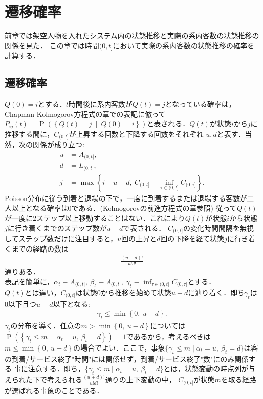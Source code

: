 \documentclass[a4j,papersize,disablejfam,slide,14pt]{jsarticle}
\def\max#1#2{\operatorname{max} \left\{ #1,\ #2 \right\}} %
\def\min#1#2{\operatorname{min} \left\{ #1,\ #2 \right\}} %
\def\inf#1#2{\operatorname*{inf}_{#1} #2 } %
\def\cprob#1#2{\operatorname{P} \left(\left\{ #1 \ \middle|\ #2 \right\}\right)} %
\begin{document}
\section{遷移確率}
	前章では架空人物を入れたシステム内の状態推移と実際の系内客数の状態推移の関係を見た．
	この章では時間$(0,t]$において実際の系内客数の状態推移の確率を計算する．

\subsection{遷移確率}
\label{sec:transient_prob}
    $Q(0)=i$とする．$t$時間後に系内客数が$Q(t)=j$となっている確率は，{\rm Chapman-Kolmogorov}方程式の章での表記に倣って
    $P_{ij}(t) = \cprob{Q(t)=j}{Q(0)=i}$と表される．$Q(t)$が状態$i$から$j$に推移する間に，$C_{(0, t]}$が上昇する回数と下降する回数をそれぞれ
    $u,d$と表す．当然，次の関係が成り立つ:
    \begin{align}
    	u &= A_{(0, t]}, \\
        d &= L_{(0, t]}, \\
    	j &= \max{i + u - d}{C_{(0, t]} - \inf{\tau \in (0, t]}{C_{(0, \tau]}}}. 
    \end{align}
    {\rm Poisson}分布に従う到着と退場の下で，一度に到着するまたは退場する客数が二人以上となる確率は$0$である．({\rm Kolmogorov}の前進方程式の章参照)
    従って$Q(t)$が一度に$2$ステップ以上移動することはない．これにより$Q(t)$が状態$i$から状態$j$に行き着くまでのステップ数が$u+d$で表される．
    $C_{(0, t]}$の変化時間間隔を無視してステップ数だけに注目すると，$u$回の上昇と$d$回の下降を経て状態$j$に行き着くまでの経路の数は
    \begin{align}
    	\frac{(u+d)!}{u!d!}
    \end{align}
    通りある．\\
    表記を簡単に，$\alpha_t \equiv A_{(0, t]},\ \beta_t \equiv A_{(0, t]},\ \gamma_t \equiv \inf{\tau \in (0, t]}{C_{(0, \tau]}}$とする．\\
    $Q(t)$とは違い，$C_{(0, t]}$は状態$0$から推移を始めて状態$u - d$に辿り着く．即ち$\gamma_t$は$0$以下且つ$u-d$以下となる:
    \begin{align}
    	\gamma_t \leq \min{0}{u - d}.
    \end{align}
    $\gamma_t$の分布を導く．任意の$m > \min{0}{u - d}$については$\cprob{\gamma_t \leq m}{\alpha_t = u,\ \beta_t = d} = 1$であるから，考えるべきは
    $m \leq \min{0}{u - d}$の場合でよい．ここで，事象$\{ \gamma_t \leq m \mid \alpha_t = u,\ \beta_t = d \}$は客の到着/サービス終了"時間"には関係せず，到着/サービス終了"数"にのみ関係する
    事に注意する．即ち，$\{ \gamma_t \leq m \mid \alpha_t = u,\ \beta_t = d \}$とは，状態変動の時点列が与えられた下で考えられる$\frac{(u+d)!}{u!d!}$通りの上下変動の中，
    $C_{(0, t]}$が状態$m$を取る経路が選ばれる事象のことである．
    
\end{document}
